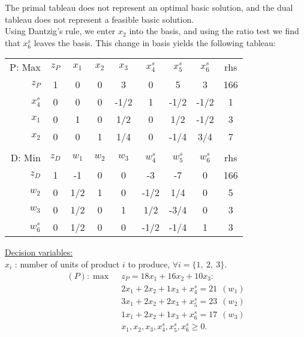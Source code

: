 The primal tableau does not represent an optimal basic solution, and the dual tableau does not represent a feasible basic solution. \\

Using Dantzig's rule, we enter $x_2$ into the basis, and using the ratio test we find that $x^s_6$ leaves the basis. This change in basis yields the following tableau:

\begin{center} \begin{tabular} {r|c|c|c|c|c|c|c|c|} \cline{2-9}  
P: Max&$z_P$ 	& $x_1$ 	& $x_2$ 	& $x_3$ 	& $x^{s}_4$	& $x^{s}_5$ 	& $x^{s}_6$ 	& rhs  \\ \cline{2-9}  \cline{2-9}   
$z_P$ 	& 1  		& 0     	& 0     	& 3      	& 0    	& 5     	& 3     	& 166  \\ \cline{2-9}  
$x^{s}_4$	& 0  		& 0     	& 0     	& -1/2   	& 1    	& -1/2  	& -1/2  	& 1   	\\ \cline{2-9} 
$x_1$	& 0  		& 1     	& 0     	& 1/2    	& 0    	& 1/2   	& -1/2  	& 3    \\ \cline{2-9}  
$x_2$	& 0  		& 0     	& 1     	& 1/4    	& 0    	& -1/4  	& 3/4   	& 7    \\ \cline{2-9} 
\multicolumn{9}{c}{ } \\ \cline{2-9}
D: Min& $z_D$ 	& $w_1$ 	& $w_2$ 	& $w_3$ 	& $w^{s}_4$ 	& $w^{s}_5$ 	& $w^{s}_6$ 	& rhs   \\ \cline{2-9} \cline{2-9}  
$z_D$ 	& 1    	& -1    	& 0     	& 0     	& -3    	& -7    	& 0     	& 166   \\ \cline{2-9}  
$w_2$	& 0    	& 1/2   	& 1     	& 0     	& -1/2  	& 1/4  	& 0     	& 5     \\ \cline{2-9}   
$w_3$ 	& 0    	& 1/2   	& 0     	& 1     	& 1/2  	& -3/4   	& 0     	& 3    \\ \cline{2-9}   
$w^{s}_6$	& 0    	& 1/2   	& 0     	& 0     	& -1/2   	& -1/4  	& 1     	& 3     \\ \cline{2-9} 
\end{tabular} \end{center}

\vspace{3mm}\underline{Decision variables:} \\
$x_i$ : number of units of product $i$ to produce, $\forall i = \{1,~2,~3\}$.
\begin{align*}
(P): \max~~  & z_P = 18x_1 + 16x_2 + 10x_3: \\
& 2x_1 + 2x_2 + 1x_3  +x^{s}_4 = 21~~ (w_1) \\
& 3x_1 + 2x_2 + 2x_3 + x^{s}_5 = 23~~ (w_2)  \\
&  1x_1 + 2x_2 + 1x_3  + x^{s}_6 = 17~~ (w_3) \\
& x_1, x_2, x_3, x^{s}_4, x^{s}_5, x^{s}_6 \ge 0.
\end{align*} 


